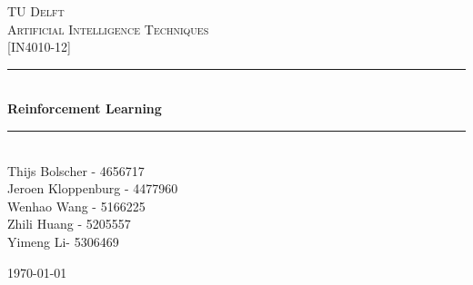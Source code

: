 \documentclass{article}
\newcommand{\divider}{\rule{\linewidth}{0.5mm}}
\begin{document}
	\begin{titlepage}
		\vfill
		\begin{center}
			\textsc{\LARGE TU Delft}\\[1.5cm]
			\textsc{\Large Artificial Intelligence Techniques}\\[0.5cm]
			\textsc{\large [IN4010-12]}\\[0.5cm]
			
			\divider \\[0.4cm]
			{ \huge \bfseries
				Reinforcement Learning
			}\\[0.4cm]
			\divider \\[1.5cm]
			
			\large
			Thijs Bolscher - 4656717\\
			Jeroen Kloppenburg - 4477960\\
			Wenhao Wang - 5166225\\
			Zhili Huang - 5205557\\
			Yimeng Li- 5306469
			\vfill
			
			{\large \today}\\[3cm]
		\end{center}
	\end{titlepage}

	
	
\end{document}

